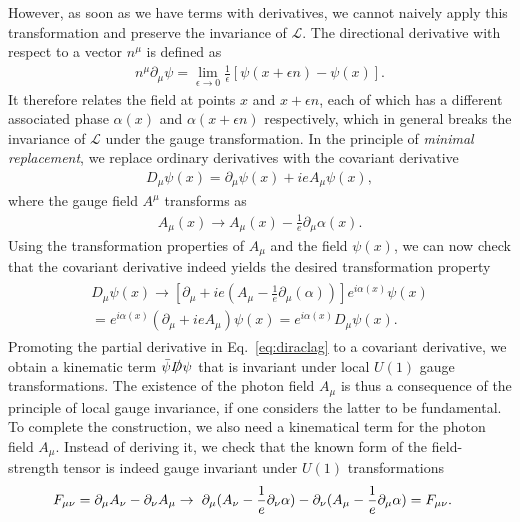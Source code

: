 However, as soon as we have terms with derivatives, we cannot naively apply this
transformation and preserve the invariance of $\mathcal{L}$. The directional derivative with respect to a vector
$n^\mu$ is defined as
\begin{align}
    n^\mu \partial_\mu \psi = \lim_{\epsilon \rightarrow 0}
  \frac{1}{\epsilon}\left[\psi(x+\epsilon n)-\psi(x) \right].
\end{align}
It therefore relates the field at points $x$
and $x+\epsilon n$, each of which has a different associated phase
$\alpha(x)$ and $\alpha(x+\epsilon n)$ respectively, which in general breaks the
invariance of $\mathcal{L}$ under the gauge transformation. In the principle of
\textit{minimal replacement}, we replace ordinary derivatives with the covariant derivative 
\begin{align}\label{eq:fincovder}
 D_\mu \psi(x) = \partial_\mu\psi(x)+ieA_\mu\psi(x),
\end{align}
where the gauge field $A^\mu$ transforms as 
\begin{align}\label{eq:photontrafo}
  A_\mu(x) \rightarrow   A_\mu(x) - \frac{1}{e}\partial_\mu \alpha(x).
\end{align}
Using the transformation properties of $A_\mu$ and the field
$\psi(x)$, we can now check that the covariant derivative indeed yields
the desired transformation property
\begin{align}
\begin{split}
 D_\mu \psi(x)\rightarrow \left[\partial_\mu+ie\left(A_\mu-\frac{1}{e}
     \partial_\mu (\alpha)\right) \right]e^{i\alpha(x)} \psi(x)\\
= e^{i\alpha(x)}\left(\partial_\mu + i e A_\mu \right) \psi(x) =
e^{i\alpha(x)}D_\mu \psi(x).
\end{split}
\end{align}
Promoting the partial derivative in Eq.~\eqref{eq:diraclag} to a
covariant derivative, we obtain a kinematic term $\bar{\psi} \slashed{D}
\psi$ that is invariant under local $U(1)$ gauge
transformations. The existence of the photon field $A_\mu$ is thus a
consequence of the principle of local gauge invariance, if one
considers the latter to be fundamental. To complete the construction, we also need a kinematical term for
the photon field $A_\mu$. Instead of deriving it, we check that the known form of the field-strength tensor
is indeed gauge invariant under $U(1)$ transformations
\begin{align}
\begin{split}
  F_{\mu\nu}=\partial_\mu A_\nu - \partial_\nu A_\mu
  \rightarrow&\hspace{0.2cm} \partial_\mu (A_\nu -\frac{1}{e}\partial_\nu \alpha)
  - \partial_\nu (A_\mu-\frac{1}{e}\partial_\mu \alpha) =  F_{\mu\nu}.
\end{split}
\end{align}
